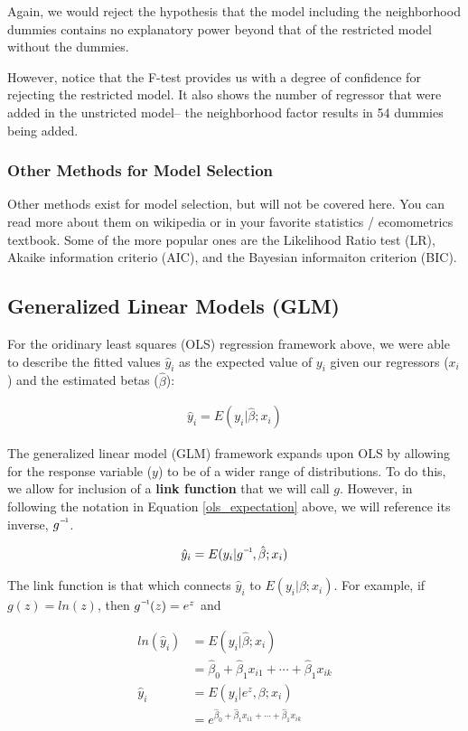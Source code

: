 \documentclass[10pt]{article}\usepackage[]{graphicx}\usepackage[]{color}
\newcommand\inv[1]{#1\raisebox{1.15ex}{$\scriptscriptstyle-\!1$}}
\begin{document}
Again, we would reject the hypothesis that the model including the neighborhood dummies contains no explanatory power beyond that of the restricted model without the dummies.

However, notice that the F-test provides us with a degree of confidence for rejecting the restricted model. It also shows the number of regressor that were added in the unstricted model-- the neighborhood factor results in 54 dummies being added.

\subsubsection*{Other Methods for Model Selection}

Other methods exist for model selection, but will not be covered here. You can read more about them on wikipedia or in your favorite statistics / ecomometrics textbook. Some of the more popular ones are the Likelihood Ratio test (LR), Akaike information criterio (AIC), and the Bayesian informaiton criterion (BIC).

\subsection*{Generalized Linear Models (GLM)  }

For the oridinary least squares (OLS) regression framework above, we were able to describe the fitted values $\hat{y}_i$ as the expected value of $y_i$ given our regressors ($x_i$) and the estimated betas ($\hat{\beta}$):

\begin{align}
  \hat{y}_i = E(y_i|\hat{\beta};x_i) \label{ols_expectation}
\end{align}

The generalized linear model (GLM) framework expands upon OLS by allowing for the response variable ($y$) to be of a wider range of distributions. To do this, we allow for inclusion of a {\bf link function} that we will call $g$. However, in following the notation in Equation \ref{ols_expectation} above, we will reference its inverse, $\inv{g}$. 

\begin{align}
  \hat{y}_i = E(y_i|\inv{g},\hat{\beta};x_i)
\end{align}

The link function is that which connects $\hat{y}_i$ to $E(y_i|\beta;x_i)$. For example, if $g(z)=ln(z)$, then $\inv{g}(z)=e^z$ and

\begin{align}
  ln(\hat{y}_i) &= E(y_i|\hat{\beta};x_i) \\
  &= \hat{\beta}_0 + \hat{\beta}_1 x_{i1} + \cdots + \hat{\beta}_1 x_{ik} \\
  \hat{y}_i &= E(y_i|e^z,\beta;x_i) \\
  &= e^{\hat{\beta}_0 + \hat{\beta}_1 x_{i1} + \cdots + \hat{\beta}_1 x_{ik}}
\end{align}
\end{document}
